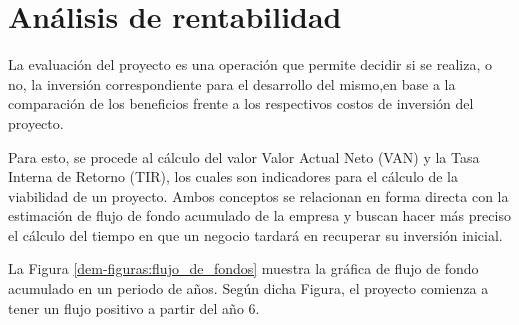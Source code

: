 \section{Análisis de rentabilidad}

La evaluación del proyecto es una operación que permite decidir si se realiza, o no, la inversión correspondiente para el desarrollo del mismo,en base a la comparación de los beneficios frente a los respectivos costos de inversión del proyecto.

Para esto, se procede al cálculo del valor Valor Actual Neto (VAN) y la Tasa Interna de Retorno (TIR), los cuales son indicadores para el cálculo de la viabilidad de un proyecto. Ambos conceptos se relacionan en forma directa con la estimación de flujo de fondo acumulado de la empresa y buscan hacer más preciso el cálculo del tiempo en que un negocio tardará en recuperar su inversión inicial.

La Figura \ref{dem-figuras:flujo_de_fondos} muestra la gráfica de flujo de fondo acumulado en un periodo de  años. Según dicha Figura, el proyecto comienza a tener un flujo positivo a partir del año 6.






